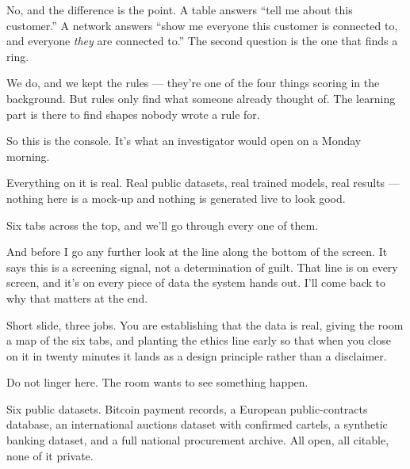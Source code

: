 \documentclass[11pt]{article}
\begin{document}
\begin{asked}
 No, and the
difference is the point. A table answers ``tell me about this customer.'' A
network answers ``show me everyone this customer is connected to, and everyone
\emph{they} are connected to.'' The second question is the one that finds a
ring.

 We do, and we
kept the rules --- they're one of the four things scoring in the background.
But rules only find what someone already thought of. The learning part is there
to find shapes nobody wrote a rule for.
\end{asked}


\begin{saythis}
So this is the console. It's what an investigator would open on a Monday
morning.

Everything on it is real. Real public datasets, real trained models, real
results --- nothing here is a mock-up and nothing is generated live to look
good.

Six tabs across the top, and we'll go through every one of them.

And before I go any further \bt look at the line along the bottom of the
screen. It says this is a screening signal, not a determination of guilt. That
line is on every screen, and it's on every piece of data the system hands out.
I'll come back to why that matters at the end.
\end{saythis}

\begin{means}
Short slide, three jobs. You are establishing that the data is real, giving the
room a map of the six tabs, and planting the ethics line early so that when you
close on it in twenty minutes it lands as a design principle rather than a
disclaimer.

Do not linger here. The room wants to see something happen.
\end{means}

\begin{asked}
 Six public datasets. Bitcoin payment
records, a European public-contracts database, an international auctions
dataset with confirmed cartels, a synthetic banking dataset, and a full
national procurement archive. All open, all citable, none of it private.
\end{asked}
\end{document}
